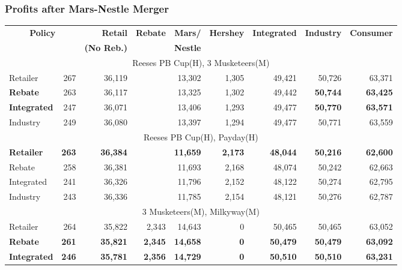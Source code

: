 \begin{frame}
\frametitle{Profits after Mars-Nestle Merger}
\tiny
\begin{table}[htbp]
  \centering
    \begin{tabular}{l | rrrrrrrr}
        \hline
\multicolumn{2}{c}{\textbf{Policy}} & \textbf{Retail} & \textbf{Rebate} & \textbf{Mars/} & \textbf{Hershey} & \textbf{Integrated} & \textbf{Industry} & \textbf{Consumer} \\
\multicolumn{2}{c}{\textbf{ }}  & \textbf{(No Reb.)} &&\textbf{Nestle}& & & & \\
\hline
\multicolumn{9}{c}{Reeses PB Cup(H), 3 Musketeers(M)}             \\
\hline
Retailer & 267   & 36,119 &       & 13,302 & 1,305 & 49,421 & 50,726 & 63,371 \\
\textbf{Rebate} & 263   & 36,117 &       & 13,325 & 1,302 & 49,442 & \textbf{50,744} & \textbf{63,425} \\
\textbf{Integrated} & 247   & 36,071 &       & 13,406 & 1,293 & 49,477 & \textbf{50,770} & \textbf{63,571} \\
Industry & 249   & 36,080 &       & 13,397 & 1,294 & 49,477 & 50,771 & 63,559 \\
\hline
\multicolumn{9}{c}{Reeses PB Cup(H), Payday(H)}                \\
\hline
\textbf{Retailer} & \textbf{263} & \textbf{36,384} & \textbf{} & \textbf{11,659} & \textbf{2,173} & \textbf{48,044} & \textbf{50,216} & \textbf{62,600} \\
Rebate & 258   & 36,381 &       & 11,693 & 2,168 & 48,074 & 50,242 & 62,663 \\
Integrated & 241   & 36,326 &       & 11,796 & 2,152 & 48,122 & 50,274 & 62,795 \\
Industry & 243   & 36,336 &       & 11,785 & 2,154 & 48,121 & 50,276 & 62,787 \\
\hline
\multicolumn{9}{c}{3 Musketeers(M), Milkyway(M)}                    \\
\hline
Retailer & 264   & 35,822 & 2,343 & 14,643 & 0     & 50,465 & 50,465 & 63,052 \\
\textbf{Rebate} & \textbf{261} & \textbf{35,821} & \textbf{2,345} & \textbf{14,658} & \textbf{0} & \textbf{50,479} & \textbf{50,479} & \textbf{63,092} \\
\textbf{Integrated} & \textbf{246} & \textbf{35,781} & \textbf{2,356} & \textbf{14,729} & \textbf{0} & \textbf{50,510} & \textbf{50,510} & \textbf{63,231} \\

\end{tabular}
\end{table}
\end{frame}
